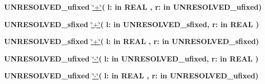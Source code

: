 \begin{DoxyCompactItemize}
\item 
{\bfseries {\bfseries \textcolor{vhdlchar}{U\+N\+R\+E\+S\+O\+L\+V\+E\+D\+\_\+ufixed}\textcolor{vhdlchar}{ }}} \hyperlink{class__fixed__pkg_aa622ccc4cb69ba73b8e7f9a8cfe42788}{\char`\"{}+\char`\"{}}{\bfseries  ( }{\bfseries \textcolor{vhdlchar}{l\+: }\textcolor{stringliteral}{in }{\bfseries \textcolor{comment}{R\+E\+A\+L}\textcolor{vhdlchar}{ }}}{\bfseries  , \textcolor{vhdlchar}{r\+: }\textcolor{stringliteral}{in }\textcolor{vhdlchar}{U\+N\+R\+E\+S\+O\+L\+V\+E\+D\+\_\+ufixed}}{\bfseries  )} 
\item 
{\bfseries {\bfseries \textcolor{vhdlchar}{U\+N\+R\+E\+S\+O\+L\+V\+E\+D\+\_\+sfixed}\textcolor{vhdlchar}{ }}} \hyperlink{class__fixed__pkg_a85a3dc07f1049b4642e6c837673edf13}{\char`\"{}+\char`\"{}}{\bfseries  ( }{\bfseries \textcolor{vhdlchar}{l\+: }\textcolor{stringliteral}{in }\textcolor{vhdlchar}{U\+N\+R\+E\+S\+O\+L\+V\+E\+D\+\_\+sfixed}}{\bfseries  , \textcolor{vhdlchar}{r\+: }\textcolor{stringliteral}{in }{\bfseries \textcolor{comment}{R\+E\+A\+L}\textcolor{vhdlchar}{ }}}{\bfseries  )} 
\item 
{\bfseries {\bfseries \textcolor{vhdlchar}{U\+N\+R\+E\+S\+O\+L\+V\+E\+D\+\_\+sfixed}\textcolor{vhdlchar}{ }}} \hyperlink{class__fixed__pkg_a85a3dc07f1049b4642e6c837673edf13}{\char`\"{}+\char`\"{}}{\bfseries  ( }{\bfseries \textcolor{vhdlchar}{l\+: }\textcolor{stringliteral}{in }{\bfseries \textcolor{comment}{R\+E\+A\+L}\textcolor{vhdlchar}{ }}}{\bfseries  , \textcolor{vhdlchar}{r\+: }\textcolor{stringliteral}{in }\textcolor{vhdlchar}{U\+N\+R\+E\+S\+O\+L\+V\+E\+D\+\_\+sfixed}}{\bfseries  )} 
\item 
{\bfseries {\bfseries \textcolor{vhdlchar}{U\+N\+R\+E\+S\+O\+L\+V\+E\+D\+\_\+ufixed}\textcolor{vhdlchar}{ }}} \hyperlink{class__fixed__pkg_a39970596105025f91b3839479d54d447}{\char`\"{}-\/\char`\"{}}{\bfseries  ( }{\bfseries \textcolor{vhdlchar}{l\+: }\textcolor{stringliteral}{in }\textcolor{vhdlchar}{U\+N\+R\+E\+S\+O\+L\+V\+E\+D\+\_\+ufixed}}{\bfseries  , \textcolor{vhdlchar}{r\+: }\textcolor{stringliteral}{in }{\bfseries \textcolor{comment}{R\+E\+A\+L}\textcolor{vhdlchar}{ }}}{\bfseries  )} 
\item 
{\bfseries {\bfseries \textcolor{vhdlchar}{U\+N\+R\+E\+S\+O\+L\+V\+E\+D\+\_\+ufixed}\textcolor{vhdlchar}{ }}} \hyperlink{class__fixed__pkg_a39970596105025f91b3839479d54d447}{\char`\"{}-\/\char`\"{}}{\bfseries  ( }{\bfseries \textcolor{vhdlchar}{l\+: }\textcolor{stringliteral}{in }{\bfseries \textcolor{comment}{R\+E\+A\+L}\textcolor{vhdlchar}{ }}}{\bfseries  , \textcolor{vhdlchar}{r\+: }\textcolor{stringliteral}{in }\textcolor{vhdlchar}{U\+N\+R\+E\+S\+O\+L\+V\+E\+D\+\_\+ufixed}}{\bfseries  )} 

\end{DoxyCompactItemize}

